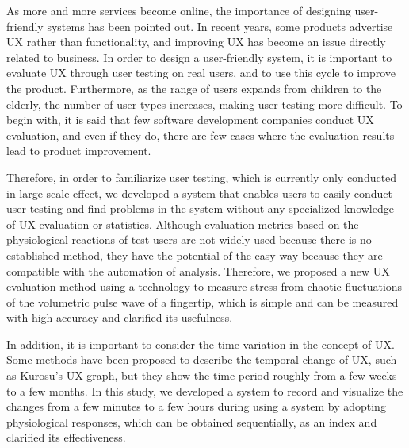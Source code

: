\begin{eabstract}

As more and more services become online, the importance of designing user-friendly systems has been pointed out. In recent years, some products advertise UX rather than functionality, and improving UX has become an issue directly related to business. In order to design a user-friendly system, it is important to evaluate UX through user testing on real users, and to use this cycle to improve the product. Furthermore, as the range of users expands from children to the elderly, the number of user types increases, making user testing more difficult. To begin with, it is said that few software development companies conduct UX evaluation, and even if they do, there are few cases where the evaluation results lead to product improvement.

Therefore, in order to familiarize user testing, which is currently only conducted in large-scale effect, we developed a system that enables users to easily conduct user testing and find problems in the system without any specialized knowledge of UX evaluation or statistics. Although evaluation metrics based on the physiological reactions of test users are not widely used because there is no established method, they have the potential of the easy way because they are compatible with the automation of analysis. Therefore, we proposed a new UX evaluation method using a technology to measure stress from chaotic fluctuations of the volumetric pulse wave of a fingertip, which is simple and can be measured with high accuracy and clarified its usefulness.

In addition, it is important to consider the time variation in the concept of UX. Some methods have been proposed to describe the temporal change of UX, such as Kurosu's UX graph, but they show the time period roughly from a few weeks to a few months. In this study, we developed a system to record and visualize the changes from a few minutes to a few hours during using a system by adopting physiological responses, which can be obtained sequentially, as an index and clarified its effectiveness.

\end{eabstract}
